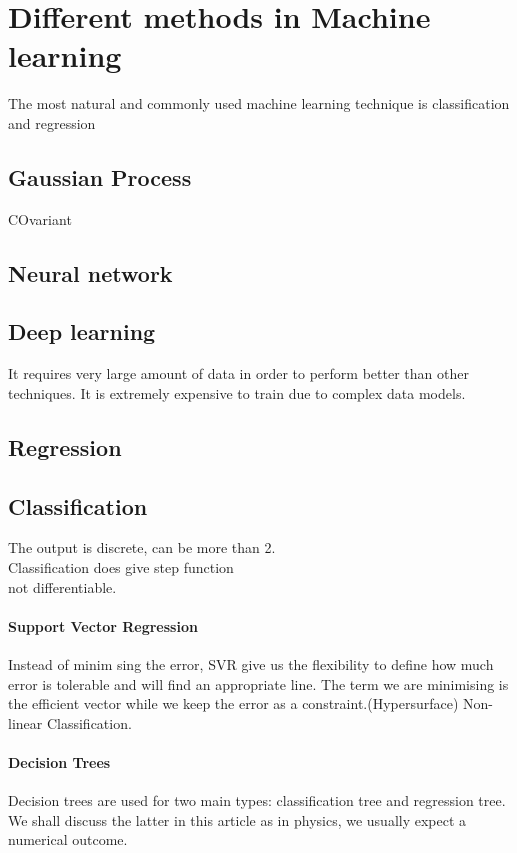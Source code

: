 \documentclass[12pt,a4paper]{article}
\begin{document}
\section{Different methods in Machine learning}
The most natural and commonly used machine learning technique is classification and regression
\subsection{Gaussian Process}
COvariant 
\subsection{Neural network}
\subsection{Deep learning}
It requires very large amount of data in order to perform better than other techniques. It is extremely expensive to train due to complex data models.
\subsection{Regression}
\subsection{Classification}
The output is discrete, can be more than 2.\\
Classification does give step function\\ not differentiable. 
\paragraph{Support Vector Regression}
Instead of minim sing the error, SVR give us the flexibility to define how much error is tolerable and will find an appropriate line. The term we are minimising is the efficient vector while we keep the error as a constraint.(Hypersurface)
Non-linear Classification.
\paragraph{Decision Trees}

Decision trees are used for two main types: classification tree and regression tree. We shall discuss the latter in this article as in physics, we usually expect a numerical outcome.
\end{document}
